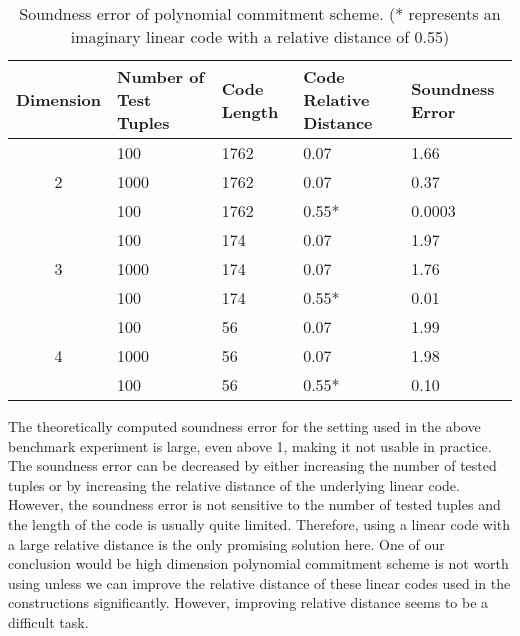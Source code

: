 \begin{table}[h!]
\centering
\begin{tabular}{| c | m{5em} | m{5em} | m{5em}  | m{5em}|} 
 \hline
 Dimension & Number of Test Tuples & Code Length & Code Relative Distance & Soundness Error \\ [0.5ex] 
 \hline\hline
 
 \multirow{3}{*}{2} & 100 & 1762 & 0.07 & 1.66  \\
  & 1000 & 1762 & 0.07 & 0.37  \\
  & 100 & 1762 & 0.55* & 0.0003  \\
 \hline
 
 \multirow{3}{*}{3} & 100 & 174  & 0.07 & 1.97 \\
 & 1000 & 174  & 0.07 & 1.76 \\
 & 100 & 174  & 0.55* & 0.01 \\
 \hline
 
 \multirow{3}{*}{4} & 100 & 56   & 0.07 & 1.99  \\
  & 1000 & 56   & 0.07 & 1.98  \\
  & 100 & 56   & 0.55* & 0.10  \\ 
 \hline
\end{tabular}
\caption{Soundness error of polynomial commitment scheme. (* represents an imaginary linear code with a relative distance of 0.55)}
\label{table:benchmark-pc-3}
\end{table}

The theoretically computed soundness error for the setting used in the above benchmark experiment is large, even above 1, making it not usable in practice. The soundness error can be decreased by either increasing the number of tested tuples or by increasing the relative distance of the underlying linear code. However, the soundness error is not sensitive to the number of tested tuples and the length of the code is usually quite limited. Therefore, using a linear code with a large relative distance is the only promising solution here. One of our conclusion would be high dimension polynomial commitment scheme is not worth using unless we can improve the relative distance of these linear codes used in the constructions significantly. However, improving relative distance seems to be a difficult task.